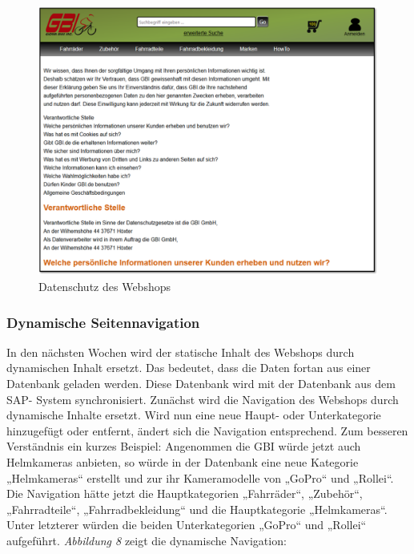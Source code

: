 \begin{figure}[H]
\begin{center}
\includegraphics[width=150mm]{Bilder/Abbildung8-DatenschutzDesWebshops.png}
\end{center}
\caption{Datenschutz des Webshops}
\end{figure}

\subsubsection{Dynamische Seitennavigation}

In den nächsten Wochen wird der statische Inhalt des Webshops durch dynamischen Inhalt ersetzt. Das bedeutet, dass die Daten fortan aus einer Datenbank geladen werden. Diese Datenbank wird mit der Datenbank aus dem SAP- System synchronisiert. Zunächst wird die Navigation des Webshops durch dynamische Inhalte ersetzt. Wird nun eine neue Haupt- oder Unterkategorie hinzugefügt oder entfernt, ändert sich die Navigation entsprechend. Zum besseren Verständnis ein kurzes Beispiel: Angenommen die GBI würde jetzt auch Helmkameras anbieten, so würde in der Datenbank eine neue Kategorie „Helmkameras“ erstellt und zur ihr Kameramodelle von „GoPro“ und „Rollei“. Die Navigation hätte jetzt die Hauptkategorien „Fahrräder“, „Zubehör“, „Fahrradteile“, „Fahrradbekleidung“ und die Hauptkategorie „Helmkameras“. Unter letzterer würden die beiden Unterkategorien „GoPro“ und „Rollei“ aufgeführt. \textit{Abbildung 8} zeigt die dynamische Navigation:

